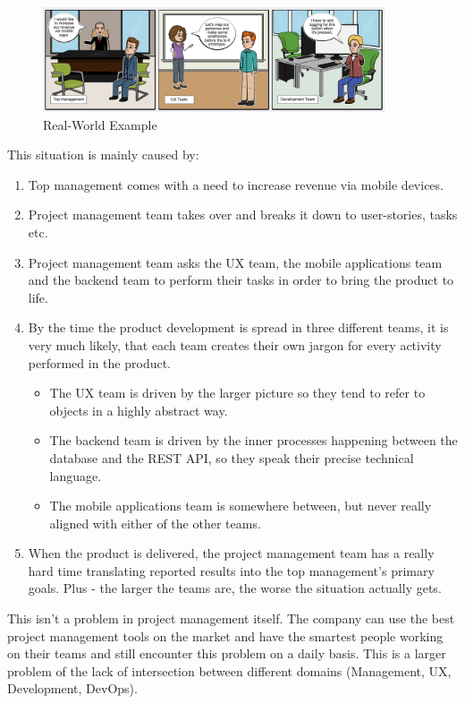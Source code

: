 \begin{figure}[!ht]
	\centering
	\includegraphics[width=0.9\textwidth]{figures/storyboard}
    \caption{Real-World Example}
\end{figure}

This situation is mainly caused by:

\begin{enumerate}
	\item Top management comes with a need to increase revenue via mobile devices.
	\item Project management team takes over and breaks it down to user-stories, tasks etc.
	\item Project management team asks the UX team, the mobile applications team and the backend team to perform their tasks in order to bring the product to life.
	\item By the time the product development is spread in three different teams, it is very much likely, that each team creates their own jargon for every activity performed in the product.
		\begin{itemize}
			\item The UX team is driven by the larger picture so they tend to refer to objects in a highly abstract way.
			\item The backend team is driven by the inner processes happening between the database and the REST API, so they speak their precise technical language.
			\item The mobile applications team is somewhere between, but never really aligned with either of the other teams.
		\end{itemize}
	\item When the product is delivered, the project management team has a really hard time translating reported results into the top management's primary goals. Plus - the larger the teams are, the worse the situation actually gets.
\end{enumerate}

This isn't a problem in project management itself. The company can use the best project management tools on the market and have the smartest people working on their teams and still encounter this problem on a daily basis. This is a larger problem of the lack of intersection between different domains (Management, UX, Development, DevOps).

